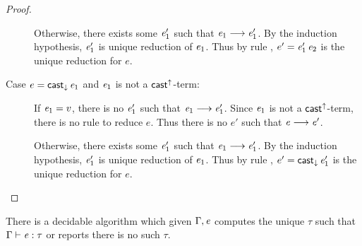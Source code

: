 \begin{proof}
\begin{description}
		Otherwise, there exists some $\mathit{e'_{{\mathrm{1}}}}$ such that $\mathit{e_{{\mathrm{1}}}}  \longrightarrow  \mathit{e'_{{\mathrm{1}}}}$. By the induction hypothesis, $\mathit{e'_{{\mathrm{1}}}}$ is unique reduction of $\mathit{e_{{\mathrm{1}}}}$. Thus by rule , $e'=\mathit{e'_{{\mathrm{1}}}} \, \mathit{e_{{\mathrm{2}}}}$ is the unique reduction for $e$.
		\item[Case $e=\mathsf{cast}_{\downarrow} \, \mathit{e_{{\mathrm{1}}}}$ and $\mathit{e_{{\mathrm{1}}}}$ is not a $ \mathsf{cast}^{\uparrow} $-term:] If $\mathit{e_{{\mathrm{1}}}}=v$, there is no $\mathit{e'_{{\mathrm{1}}}}$ such that $\mathit{e_{{\mathrm{1}}}}  \longrightarrow  \mathit{e'_{{\mathrm{1}}}}$. Since $\mathit{e_{{\mathrm{1}}}}$ is not a $ \mathsf{cast}^{\uparrow} $-term, there is no rule to reduce $e$. Thus there is no $e'$ such that $\mathit{e}  \longrightarrow  \mathit{e'}$.
		
		Otherwise, there exists some $\mathit{e'_{{\mathrm{1}}}}$ such that $\mathit{e_{{\mathrm{1}}}}  \longrightarrow  \mathit{e'_{{\mathrm{1}}}}$. By the induction hypothesis, $\mathit{e'_{{\mathrm{1}}}}$ is unique reduction of $\mathit{e_{{\mathrm{1}}}}$. Thus by rule , $e'=\mathsf{cast}_{\downarrow} \, \mathit{e'_{{\mathrm{1}}}}$ is the unique reduction for $e$.
	\end{description}
\end{proof}

\begin{lem}
	There is a decidable algorithm which given $\Gamma, \mathit{e}$ computes the unique $\tau$ such that $\Gamma  \vdash  \mathit{e}  :  \tau$ or reports there is no such $\tau$.
\end{lem}

